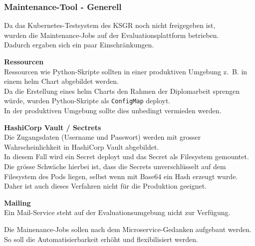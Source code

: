 
\begin{flushleft}
    \subsubsection{Maintenance-Tool - Generell}
    Da das \Gls{Kubernetes}-Testsystem des KSGR noch nicht freigegeben ist,\\
    wurden die Maintenance-Jobs auf der Evaluationsplattform betrieben.\\
    Dadurch ergaben sich ein paar Einschränkungen.
    \begin{description}
        \item \textbf{Ressourcen}\hfill \\Ressourcen wie Python-Skripte sollten in einer produktiven Umgebung z. B. in einem \Gls{helm} Chart abgebildet werden.\\Da die Erstellung eines \gls{helm} Charts den Rahmen der Diplomarbeit sprengen würde, wurden Python-Skripte als \texttt{ConfigMap} deployt.\\In der produktiven Umgebung sollte dies unbedingt vermieden werden.
        \item \textbf{HashiCorp Vault / Sectrets}\hfill \\Die Zugangsdaten (Username und Passwort) werden mit grosser Wahrscheinlichkeit in HashiCorp Vault \cite{ANQ2ENVU} abgebildet.\\In diesem Fall wird ein Secret deployt und das Secret als Filesystem gemountet.\\Die grösse Schwäche hierbei ist, dass die Secrets unverschlüsselt auf dem Filesystem des Pods liegen, selbst wenn mit Base64 ein Hash erzeugt wurde.\\Daher ist auch dieses Verfahren nicht für die Produktion geeignet.
        \item \textbf{Mailing}\hfill \\Ein Mail-Service steht auf der Evaluationsumgebung nicht zur Verfügung.
    \end{description}
\end{flushleft}
\begin{flushleft}
    Die Mainenance-Jobs sollen nach dem Microservice-Gedanken aufgebaut werden.\\
    So soll die Automatisierbarkeit erhöht und flexibilisiert werden.
\end{flushleft}